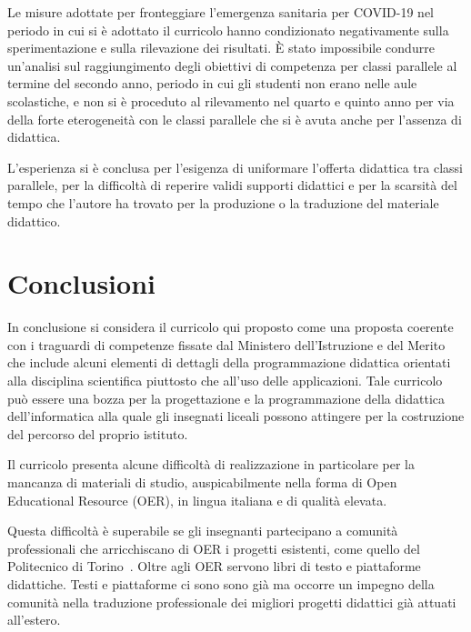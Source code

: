 \documentclass[a4paper]{easychair}
\begin{document}
Le misure adottate per fronteggiare l'emergenza sanitaria per COVID-19 nel periodo in cui
si è adottato il curricolo hanno condizionato negativamente sulla sperimentazione e sulla
rilevazione dei risultati.
È stato impossibile condurre un'analisi sul raggiungimento degli obiettivi di competenza per classi
parallele al termine del secondo anno, periodo in cui gli studenti non erano nelle aule scolastiche,
e non si è proceduto al rilevamento nel quarto e quinto anno per via della forte eterogeneità con le
classi parallele che si è avuta anche per l'assenza di didattica.

L'esperienza si è conclusa per l'esigenza di uniformare l'offerta didattica tra classi parallele,
per la difficoltà di reperire validi supporti didattici e per la scarsità del tempo che l'autore
ha trovato per la produzione o la traduzione del materiale didattico.

\section{Conclusioni}
\label{sec:conclusioni}

In conclusione si considera il curricolo qui proposto come
una proposta coerente con i traguardi di competenze fissate dal  
Ministero dell'Istruzione e del Merito che include alcuni elementi
di dettagli della programmazione didattica
orientati alla disciplina scientifica piuttosto che all'uso delle applicazioni.
Tale curricolo può essere una bozza per la progettazione e la programmazione
della didattica dell'informatica %
alla quale gli insegnati liceali possono attingere per la costruzione del percorso
del proprio istituto.

Il curricolo presenta alcune difficoltà di realizzazione in particolare per
la mancanza di materiali di studio, auspicabilmente nella forma di Open Educational Resource (OER),
in lingua italiana e di qualità elevata.


Questa difficoltà è superabile se gli insegnanti partecipano a comunità professionali
che arricchiscano di OER i progetti esistenti, come quello del Politecnico di Torino~\cite{fare}.
Oltre agli OER servono libri di testo e piattaforme didattiche.
Testi e piattaforme ci sono sono già ma occorre un impegno della comunità nella traduzione
professionale dei migliori progetti didattici già attuati all'estero.

\label{sect:bib}
%
%
%
\printbibliography
\end{document}
